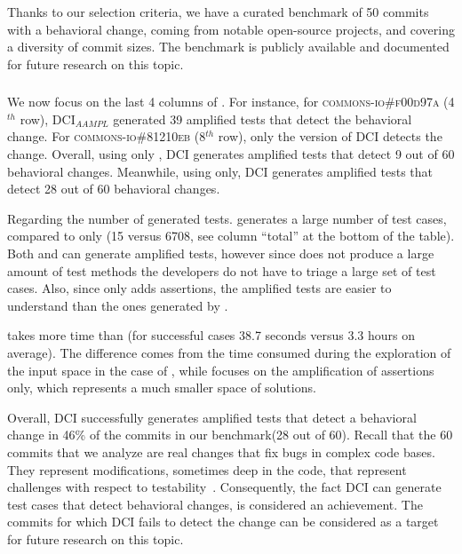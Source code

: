 Thanks to our selection criteria, we have a curated benchmark of 50 commits with a behavioral change, coming from notable open-source projects, and covering a diversity of commit sizes. The benchmark is publicly available and documented for future research on this topic.

\subsubsection{\rqdetection}
\label{subsubsec:answerq2}

We now focus on the last 4 columns of .
For instance, for \textsc{commons-io\#f00d97a} (4$^{th}$ row), DCI$_{AAMPL}$ generated 39 amplified tests that detect the behavioral change. 
For \textsc{commons-io\#81210eb} (8$^{th}$ row), only the \sbampl version of DCI detects the change.
%
Overall, using only \aampl, DCI generates amplified tests that detect 9 out of 60 behavioral changes.
Meanwhile, using \sbampl only, DCI generates amplified tests that detect 28 out of 60 behavioral changes.

Regarding the number of generated tests.
\DCII generates a large number of test cases, compared to \DCIA only (15 versus 6708, see column ``total'' at the bottom of the table). 
Both \DCIA and \DCIA can generate amplified tests, however since \DCIA does not produce a large amount of test methods the developers do not have to triage a large set of test cases. 
Also, since \DCIA only adds assertions, the amplified tests are easier to understand than the ones generated by \DCII.

\DCII takes more time than \DCIA (for successful cases 38.7 seconds versus 3.3 hours on average).
The difference comes from the time consumed during the exploration of the input space in the case of \DCII, while \DCIA focuses on the amplification of assertions only, which represents a much smaller space of solutions. 

Overall, DCI successfully generates amplified tests that detect a behavioral change in 46\% of the commits in our benchmark(28 out of 60).
Recall that the 60 commits that we analyze are real changes that fix bugs in complex code bases.
They represent modifications, sometimes deep in the code, that represent challenges with respect to testability~\cite{voas1995software}.
Consequently, the fact DCI can generate test cases that detect behavioral changes, is considered an achievement.
The commits for which DCI fails to detect the change can be considered as a target for future research on this topic.


